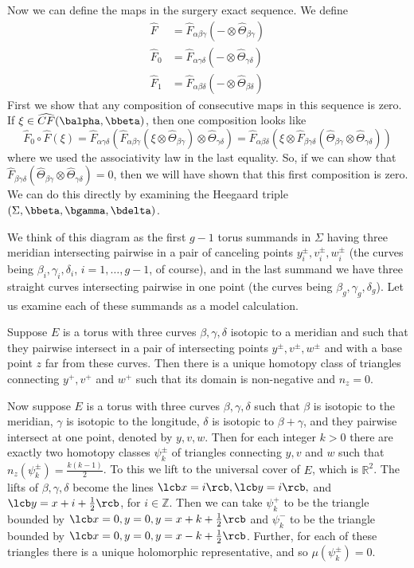 Now we can define the maps in the surgery exact sequence. We define
\begin{align*}
	\widehat{F}   &= \widehat{F}_{\alpha\beta\gamma} (- \otimes \widehat{\Theta}_{\beta\gamma}) \\
	\widehat{F}_0 &= \widehat{F}_{\alpha\gamma\delta}(- \otimes \widehat{\Theta}_{\gamma\delta}) \\
	\widehat{F}_1 &= \widehat{F}_{\alpha\beta\delta} (- \otimes \widehat{\Theta}_{\beta\delta}) 
\end{align*}
First we show that any composition of consecutive maps in this sequence is zero. If $\xi \in \widehat{CF}(\balpha,\bbeta)$, then one composition looks like
\[ \widehat{F}_0 \circ \widehat{F}(\xi) = \widehat{F}_{\alpha\gamma\delta}(\widehat{F}_{\alpha\beta\gamma}(\xi \otimes \widehat{\Theta}_{\beta\gamma}) \otimes \widehat{\Theta}_{\gamma\delta}) = \widehat{F}_{\alpha\beta\delta}(\xi \otimes \widehat{F}_{\beta\gamma\delta}(\widehat{\Theta}_{\beta\gamma} \otimes \widehat{\Theta}_{\gamma\delta})) \]
where we used the associativity law in the last equality. So, if we can show that $\widehat{F}_{\beta\gamma\delta}(\widehat{\Theta}_{\beta\gamma} \otimes \widehat{\Theta}_{\gamma\delta})=0$, then we will have shown that this first composition is zero. We can do this directly by examining the Heegaard triple $(\Sigma,\bbeta,\bgamma,\bdelta)$.

We think of this diagram as the first $g-1$ torus summands in $\Sigma$ having three meridian intersecting pairwise in a pair of canceling points $y_i^\pm,v_i^\pm,w_i^\pm$ (the curves being $\beta_i,\gamma_i,\delta_i$, $i=1,\ldots,g-1$, of course), and in the last summand we have three straight curves intersecting pairwise in one point (the curves being $\beta_g,\gamma_g,\delta_g$). Let us examine each of these summands as a model calculation.

Suppose $E$ is a torus with three curves $\beta,\gamma,\delta$ isotopic to a meridian and such that they pairwise intersect in a pair of intersecting points $y^\pm,v^\pm,w^\pm$ and with a base point $z$ far from these curves. Then there is a unique homotopy class of triangles connecting $y^+,v^+$ and $w^+$ such that its domain is non-negative and $n_z=0$.

Now suppose $E$ is a torus with three curves $\beta,\gamma,\delta$ such that $\beta$ is isotopic to the meridian, $\gamma$ is isotopic to the longitude, $\delta$ is isotopic to $\beta+\gamma$, and they pairwise intersect at one point, denoted by $y,v,w$. Then for each integer $k>0$ there are exactly two homotopy classes $\psi_k^\pm$ of triangles connecting $y,v$ and $w$ such that $n_z(\psi_k^\pm)=\frac{k(k-1)}{2}$. To this we lift to the universal cover of $E$, which is $\mathbb R^2$. The lifts of $\beta,\gamma,\delta$ become the lines $\lcb x=i \rcb,\lcb y=i \rcb,$ and $\lcb y=x+i+\frac{1}{2} \rcb$, for $i \in \mathbb Z$. Then we can take $\psi_k^+$ to be the triangle bounded by $\lcb x=0,y=0,y=x+k+\frac{1}{2} \rcb$ and $\psi_k^-$ to be the triangle bounded by $\lcb x=0,y=0,y=x-k+\frac{1}{2} \rcb$. Further, for each of these triangles there is a unique holomorphic representative, and so $\mu(\psi_k^\pm)=0$.

